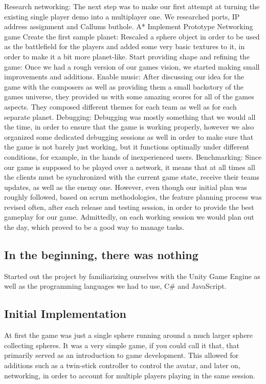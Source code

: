 \documentclass[11pt,a4paper]{article}
\begin{document}
        Research networking: The next step was to make our first attempt at turning the existing single player demo into a multiplayer one. We researched ports, IP address assignment and Callums buthole. A*
        Implement Prototype Networking game 
        Create the first sample planet: Rescaled a sphere object in order to be used as the battlefield for the players and added some very basic textures to it, in order to make it a bit more planet-like.
        Start providing shape and refining the game: Once we had a rough version of our games vision, we started making small improvements and additions.  
        Enable music: After discussing our idea for the game with the composers as well as providing them a small backstory of the games universe, they provided us with some amazing scores for all of the games aspects. They composed different themes for each team as well as for each separate planet.
        Debugging: Debugging was mostly something that we would all the time, in order to ensure that the game is working properly, however we also organized some dedicated debugging sessions as well in order to make sure that the game is not barely just working, but it functions optimally under different conditions, for example, in the hands of inexperienced users.
        Benchmarking: Since our game is supposed to be played over a network, it means that at all times all the clients must be synchronized with the current game state, receive their teams updates, as well as the enemy one. 
        However, even though our initial plan was roughly followed, based on scrum methodologies, the feature planning process was revised often, after each release and testing session, in order to provide the best gameplay for our game. Admittedly, on each working session we would plan out the day, which proved to be a good way to manage tasks.

        \subsection{ In the beginning, there was nothing }
        Started out the project by familiarizing ourselves with the Unity Game Engine  as well as the programming languages we had to use, C\# and JavaScript.

        \subsection{Initial Implementation}
        At first the game was just a single sphere running around a much larger sphere collecting spheres. It was a very simple game, if you could call it that, that primarily served as an introduction to game development. This allowed for additions such as a twin-stick controller to control the avatar, and later on, networking, in order to account for multiple players playing in the same session.
\end{document}
